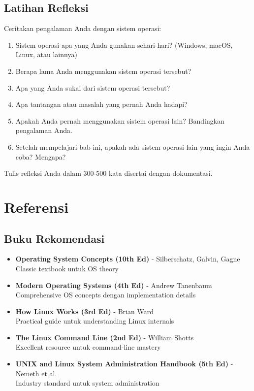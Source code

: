 \subsection{Latihan Refleksi}

\begin{exercisebox}[1.6]
Ceritakan pengalaman Anda dengan sistem operasi:
\begin{enumerate}
    \item Sistem operasi apa yang Anda gunakan sehari-hari? (Windows, macOS, Linux, atau lainnya)
    \item Berapa lama Anda menggunakan sistem operasi tersebut?
    \item Apa yang Anda sukai dari sistem operasi tersebut?
    \item Apa tantangan atau masalah yang pernah Anda hadapi?
    \item Apakah Anda pernah menggunakan sistem operasi lain? Bandingkan pengalaman Anda.
    \item Setelah mempelajari bab ini, apakah ada sistem operasi lain yang ingin Anda coba? Mengapa?
\end{enumerate}
Tulis refleksi Anda dalam 300-500 kata disertai dengan dokumentasi.
\end{exercisebox}

\section{Referensi}
\label{sec:references}

\subsection{Buku Rekomendasi}

\begin{itemize}
    \item \textbf{Operating System Concepts (10th Ed)} - Silberschatz, Galvin, Gagne \\
    Classic textbook untuk OS theory

    \item \textbf{Modern Operating Systems (4th Ed)} - Andrew Tanenbaum \\
    Comprehensive OS concepts dengan implementation details

    \item \textbf{How Linux Works (3rd Ed)} - Brian Ward \\
    Practical guide untuk understanding Linux internals

    \item \textbf{The Linux Command Line (2nd Ed)} - William Shotts \\
    Excellent resource untuk command-line mastery

    \item \textbf{UNIX and Linux System Administration Handbook (5th Ed)} - Nemeth et al. \\
    Industry standard untuk system administration
\end{itemize}

